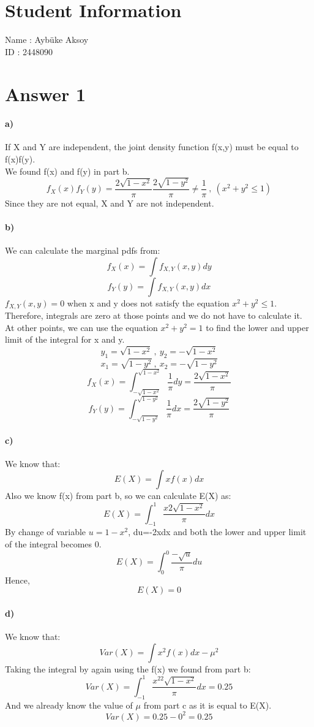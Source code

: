\documentclass[12pt]{article}
\begin{document}
\section*{Student Information}

Name : Aybüke Aksoy\\

ID : 2448090\\


\section*{Answer 1}
\paragraph{a)}
If X and Y are independent, the joint density function f(x,y) must be equal to f(x)f(y).\\
We found f(x) and f(y) in part b. 
\[f_X(x)f_Y(y)=\frac{2\sqrt{1-x^2}}{\pi}\frac{2\sqrt{1-y^2}}{\pi} \neq \frac{1}{\pi} \ , \ (x^2+y^2\leq1)\]
Since they are not equal, X and Y are not independent.

\paragraph{b)}
We can calculate the marginal pdfs from:
\[f_X(x)=\int f_{X,Y}(x,y)dy\]
\[f_Y(y)=\int f_{X,Y}(x,y)dx\]
$f_{X,Y}(x,y)=0$ when x and y does not satisfy the equation $x^2+y^2 \leq 1$. Therefore, integrals are zero at those points and we do not have to calculate it.\\
At other points, we can use the equation $x^2+y^2 = 1$ to find the lower and upper limit of the integral for x and y. 
\[y_1=\sqrt{1-x^2} \ , \ y_2=-\sqrt{1-x^2}\]
\[x_1=\sqrt{1-y^2} \ , \ x_2=-\sqrt{1-y^2}\]
\[f_X(x)=\int_{-\sqrt{1-x^2}}^{\sqrt{1-x^2}}\frac{1}{\pi}dy = \frac{2\sqrt{1-x^2}}{\pi}\]
\[f_Y(y)=\int_{-\sqrt{1-y^2}}^{\sqrt{1-y^2}}\frac{1}{\pi}dx = \frac{2\sqrt{1-y^2}}{\pi}\]
\paragraph{c)}
We know that:
\[E(X)=\int xf(x)dx\]
Also we know f(x) from part b, so we can calculate E(X) as:
\[E(X)=\int_{-1}^{1}\frac{x2\sqrt{1-x^2}}{\pi}dx\]
By change of variable $u=1-x^2$,
du=-2xdx and both the lower and upper limit of the integral becomes 0.
\[E(X)=\int_{0}^{0}\frac{-\sqrt{u}}{\pi}du\]
Hence, 
\[E(X)=0\]
\paragraph{d)}
We know that:
\[Var(X)=\int x^2f(x)dx-\mu^2\]
Taking the integral by again using the f(x) we found from part b:
\[Var(X)=\int_{-1}^{1}\frac{x^22\sqrt{1-x^2}}{\pi}dx=0.25\] 
And we already know the value of $\mu$ from part c as it is equal to E(X).
\[Var(X)=0.25-0^2=0.25\]
\end{document}
